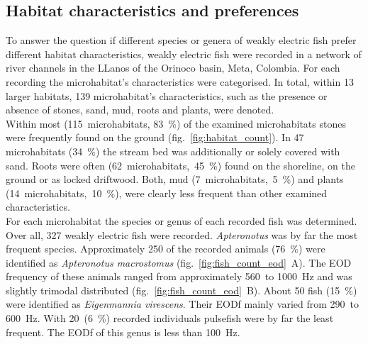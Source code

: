 
\subsection{Habitat characteristics and preferences}

To answer the question if different species or genera of weakly electric fish prefer different habitat characteristics, weakly electric fish were recorded in a network of river channels in the LLanos of the Orinoco basin, Meta, Colombia. For each recording the microhabitat's characteristics were categorised. In total, within 13 larger habitats, 139 microhabitat's characteristics, such as the presence or absence of stones, sand, mud, roots and plants, were denoted.\\
Within most (115~microhabitats, 83~\%) of the examined microhabitats stones were frequently found on the ground (fig.~\ref{fig:habitat_count}). In 47 microhabitats  (34~\%) the stream bed was additionally or solely covered with sand. Roots were often (62~microhabitats,~45~\%) found on the shoreline, on the ground or as locked driftwood. Both, mud (7~microhabitats,~5~\%) and plants (14~microhabitats,~10~\%), were clearly less frequent than other examined characteristics.\\
For each microhabitat the species or genus of each recorded fish was determined. Over all, 327 weakly electric fish were recorded. \textit{Apteronotus} was by far the most frequent species. Approximately 250 of the recorded animals (76~\%) were identified as \textit{Apteronotus macrostomus} (fig.~\ref{fig:fish_count_eod}~A). The EOD frequency of these animals ranged from approximately 560~to 1000~Hz and was slightly trimodal distributed (fig.~\ref{fig:fish_count_eod}~B). About 50 fish (15~\%) were identified as \textit{Eigenmannia virescens}. Their EODf mainly varied from 290~to 600~Hz. With 20~(6~\%) recorded individuals pulsefish were by far the least frequent. The EODf of this genus is less than 100~Hz.


